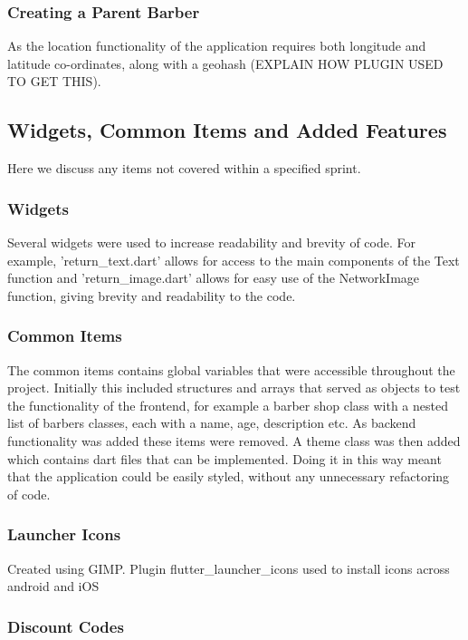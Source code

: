 \documentclass[12pt]{article}
\begin{document}
	\subsubsection{Creating a Parent Barber}
	As the location functionality of the application requires both longitude and latitude co-ordinates, along with a geohash (EXPLAIN HOW PLUGIN USED TO GET THIS).
	
	\subsection{Widgets, Common Items and Added Features}
	Here we discuss any items not covered within a specified sprint.
	
	\subsubsection{Widgets}
	Several widgets were used to increase readability and brevity of code. For example, 'return\_text.dart' allows for access to the main components of the Text function and 'return\_image.dart' allows for easy use of the NetworkImage function, giving brevity and readability to the code.
	
	\subsubsection{Common Items}
	The common items contains global variables that were accessible throughout the project. Initially this included structures and arrays that served as objects to test the functionality of the frontend, for example a barber shop class with a nested list of barbers classes, each with a name, age, description etc. As backend functionality was added these items were removed. A theme class was then added which contains dart files that can be implemented. Doing it in this way meant that the application could be easily styled, without any unnecessary refactoring of code.
	
	\subsubsection{Launcher Icons}
	Created using GIMP. Plugin flutter\_launcher\_icons used to install icons across android and iOS
	
	\subsubsection{Discount Codes}
	
\end{document}
